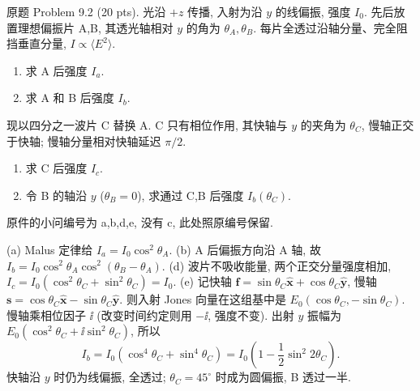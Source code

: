 \begin{exercise}\label{ps:9.2}
原题 Problem 9.2 (20 pts). 光沿 $+z$ 传播, 入射为沿 $y$ 的线偏振, 强度 $I_0$. 先后放置理想偏振片 A,B, 其透光轴相对 $y$ 的角为 $\theta_A,\theta_B$. 每片全透过沿轴分量、完全阻挡垂直分量, $I\propto\langle E^2\rangle$.
\begin{enumerate}[label=\alph*.]
\item 求 A 后强度 $I_a$.
\item 求 A 和 B 后强度 $I_b$.
\end{enumerate}
现以四分之一波片 C 替换 A. C 只有相位作用, 其快轴与 $y$ 的夹角为 $\theta_C$, 慢轴正交于快轴; 慢轴分量相对快轴延迟 $\pi/2$.
\begin{enumerate}[label=\alph*.,start=4]
\item 求 C 后强度 $I_c$.
\item 令 B 的轴沿 $y$ ($\theta_B=0$), 求通过 C,B 后强度 $I_b(\theta_C)$.
\end{enumerate}
原件的小问编号为 a,b,d,e, 没有 c, 此处照原编号保留.
\end{exercise}
\begin{solution}
(a) Malus 定律给 $I_a=I_0\cos^2\theta_A$.
(b) A 后偏振方向沿 A 轴, 故 $I_b=I_0\cos^2\theta_A\cos^2(\theta_B-\theta_A)$.
(d) 波片不吸收能量, 两个正交分量强度相加, $I_c=I_0(\cos^2\theta_C+\sin^2\theta_C)=I_0$.
(e) 记快轴 $\mathbf f=\sin\theta_C\hat{\mathbf x}+\cos\theta_C\hat{\mathbf y}$, 慢轴 $\mathbf s=\cos\theta_C\hat{\mathbf x}-\sin\theta_C\hat{\mathbf y}$. 则入射 Jones 向量在这组基中是 $E_0(\cos\theta_C,-\sin\theta_C)$. 慢轴乘相位因子 $\ii$ (改变时间约定则用 $-\ii$, 强度不变). 出射 $y$ 振幅为 $E_0(\cos^2\theta_C+\ii\sin^2\theta_C)$, 所以
\[
I_b=I_0(\cos^4\theta_C+\sin^4\theta_C)
=I_0\left(1-\frac12\sin^2 2\theta_C\right).
\]
快轴沿 $y$ 时仍为线偏振, 全透过; $\theta_C=45^\circ$ 时成为圆偏振, B 透过一半.
\end{solution}

